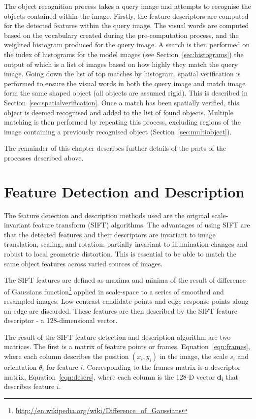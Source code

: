 \documentclass[11pt, onecolumn, a4paper, final]{report} %
\begin{document}
The object recognition process takes a query image and attempts to recognise the objects contained within the image. Firstly, the feature descriptors are computed for the detected features within the query image. The visual words are computed based on the vocabulary created during the pre-computation process, and the weighted histogram produced for the query image. A search is then performed on the index of histograms for the model images (see Section~\ref{sec:histograms}) the output of which is a list of images based on how highly they match the query image. Going down the list of top matches by histogram, spatial verification is performed to ensure the visual words in both the query image and match image form the same shaped object (all objects are assumed rigid). This is described in Section~\ref{sec:spatialverification}. Once a match has been spatially verified, this object is deemed recognised and added to the list of found objects. Multiple matching is then performed by repeating this process, excluding regions of the image containing a previously recognised object (Section~\ref{sec:multiobject}).

The remainder of this chapter describes further details of the parts of the processes described above.

\section{Feature Detection and Description}
\label{sec:featuredetection}
The feature detection and description methods used are the original scale-invariant feature transform (SIFT) algorithms. The advantages of using SIFT are that the detected features and their descriptors are invariant to image translation, scaling, and rotation, partially invariant to illumination changes and robust to local geometric distortion. This is essential to be able to match the same object features across varied sources of images.

The SIFT features are defined as maxima and minima of the result of difference of Gaussians function\footnote{\url{http://en.wikipedia.org/wiki/Difference_of_Gaussians}} applied in scale-space to a series of smoothed and resampled images. Low contrast candidate points and edge response points along an edge are discarded. These features are then described by the SIFT feature descriptor - a 128-dimensional vector.

The result of the SIFT feature detection and description algorithm are two matrices. The first is a matrix of feature points or frames, Equation~\ref{eqn:frames}, where each column describes the position $(x_i, y_i)$ in the image, the scale $s_i$ and orientation $\theta_i$ for feature $i$. Corresponding to the frames matrix is a descriptor matrix, Equation~\ref{eqn:descrs}, where each column is the 128-D vector $\mathbf{d_i}$ that describes feature $i$.
\end{document}
